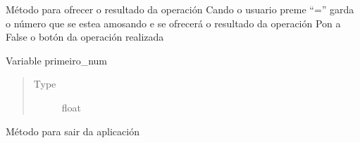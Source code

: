 \documentclass[letterpaper,10pt,spanish]{sphinxmanual}
\begin{document}
\begin{fulllineitems}
\begin{fulllineitems}
\end{fulllineitems}


\begin{fulllineitems}
\label{\detokenize{api/modulos:calculadora_infantil.CalculinhaApp.preme_resultado}}
\sphinxAtStartPar
Método para ofrecer o resultado da operación
Cando o usuario preme “=” garda o número que se estea amosando
e se ofrecerá o resultado da operación
Pon a False o botón da operación realizada

\end{fulllineitems}


\begin{fulllineitems}
\label{\detokenize{api/modulos:calculadora_infantil.CalculinhaApp.primeiro_num}}
\sphinxAtStartPar
Variable primeiro\_num
\begin{quote}\begin{description}
\item[{Type}] \leavevmode
\sphinxAtStartPar
float

\end{description}\end{quote}

\end{fulllineitems}


\begin{fulllineitems}
\label{\detokenize{api/modulos:calculadora_infantil.CalculinhaApp.sair}}
\sphinxAtStartPar
Método para sair da aplicación

\end{fulllineitems}


\begin{fulllineitems}
\label{\detokenize{api/modulos:calculadora_infantil.CalculinhaApp.staticMetaObject}}
\end{fulllineitems}


\end{fulllineitems}
\end{document}
